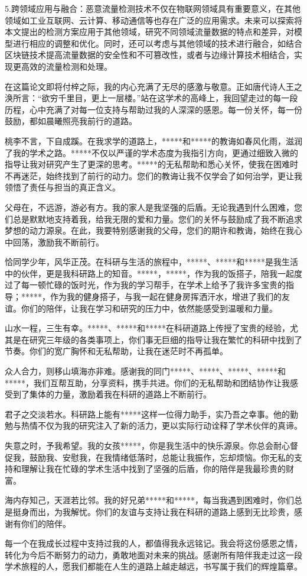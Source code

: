 \documentclass[promaster]{thesis-uestc}
\begin{document}
5.跨领域应用与融合：恶意流量检测技术不仅在物联网领域具有重要意义，在其他领域如工业互联网、云计算、移动通信等也存在广泛的应用需求。未来可以探索将本文提出的检测方案应用于其他领域，研究不同领域流量数据的特点和差异，对模型进行相应的调整和优化。同时，还可以考虑与其他领域的技术进行融合，如结合区块链技术提高流量数据的安全性和不可篡改性，或者与边缘计算技术相结合，实现更高效的流量检测和处理。




\thesisacknowledgement


在这篇论文即将付梓之际，我的内心充满了无尽的感激与敬意。正如唐代诗人王之涣所言：“欲穷千里目，更上一层楼。”站在这学术的高峰上，我回望走过的每一段历程，心中充满了对每一位支持与帮助过我的人深深的感恩。每一份关怀，每一份鼓励，都如晨曦照亮我前行的道路。

桃李不言，下自成蹊。在我求学的道路上，*****和*****的教诲如春风化雨，滋润了我的学术之路。*****不仅以严谨的学术态度为我指引方向，更通过细致入微的指导让我对研究产生了更深的思考。*****的无私帮助和悉心关怀，使我在困难时不再迷茫，始终找到了前行的动力。您们的教诲让我不仅学会了如何治学，更让我领悟了责任与担当的真正含义。

父母在，不远游，游必有方。我的家人是我坚强的后盾。无论我遇到什么困难，您们总是默默地支持着我，给我无限的爱和力量。您们的关怀与鼓励成了我不断追求梦想的动力源泉。在此，我要特别感谢我的父母，您们的期许和教诲，始终在我心中回荡，激励我不断前行。

恰同学少年，风华正茂。在科研与生活的旅程中，*****、*****和*****是我生活中的伙伴，更是我科研路上的知音。*****，*****，作为我的饭搭子，陪我一起度过了每一顿忙碌的饭时光，作为我的学习帮手，在学术上给予了我许多宝贵的指导；*****，作为我的健身搭子，与我一起在健身房挥洒汗水，增进了我们的友谊。你们的陪伴，让我在学习和研究的压力中，依然能感受到温暖和力量。

山水一程，三生有幸。*****、*****和*****在科研道路上传授了宝贵的经验，尤其是在研究三年级的各类事项上，你们事无巨细的指导让我在繁忙的科研中找到了节奏。你们的宽广胸怀和无私帮助，让我在迷茫时不再孤单。

众人合力，则移山填海亦非难。感谢我的同门*****、*****、*****、*****和*****，我们互帮互助，分享资料，携手共进。你们的无私帮助和团结协作让我感受到了集体的力量，激励着我在科研的道路上不断前行。

君子之交淡若水。科研路上能有*****这样一位得力助手，实乃吾之幸事。他的勤勉与热情不仅为我的研究注入了新的活力，更以实际行动诠释了学术伙伴的真谛。

失意之时，予我希望。我的女孩*****，你是我生活中的快乐源泉。你总会耐心督促我，鼓励我、安慰我，在我情绪低落时，总能让我振作，忘却烦恼。你无私的支持和理解让我在忙碌的学术生活中找到了坚强的后盾，你的陪伴是我最珍贵的财富。

海内存知己，天涯若比邻。我的好兄弟*****和*****，每当我遇到困难时，你们总是挺身而出，为我解忧。你们的友谊与支持让我在科研的道路上感到无比珍贵，感谢有你们的陪伴。

每一个在我成长过程中支持过我的人，都值得我永远铭记。我会将这份感恩之情，转化为今后不断努力的动力，勇敢地面对未来的挑战。感谢所有陪伴我走过这一段学术旅程的人，愿我们都能在人生的道路上越走越远，书写属于我们的辉煌篇章。


\end{document}
